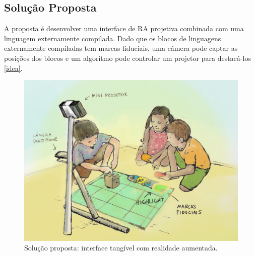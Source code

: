 \subsection{Solução Proposta}
\label{ss_cintro_solucao}

A proposta é desenvolver uma interface de \ac{RA} projetiva combinada com uma linguagem externamente compilada. Dado que os blocos de linguagens externamente compiladas tem marcas fiduciais, uma câmera pode captar as posições dos blocos e um algoritmo pode controlar um projetor para destacá-los \autoref{idea}.

\begin{figure}[!htpb]
  \centering
  \includegraphics[width=.85\linewidth,fbox]{figs/idea_2.png}
  \caption{Solução proposta: interface tangível com realidade aumentada.}
  \sourceauthor
  \label{idea}
\end{figure}

